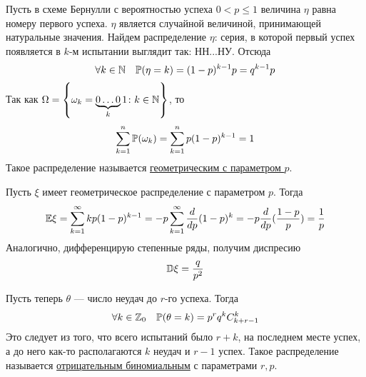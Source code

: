 \documentclass[../TV&MS.tex]{subfiles}
\begin{document}
Пусть в схеме Бернулли с вероятностью успеха $0 < p \le 1$ величина $\eta$ равна номеру первого успеха. $\eta$ является случайной величиной, принимающей натуральные значения. Найдем распределение $\eta$: серия, в которой первый успех появляется в $k$-м испытании выглядит так: НН...НУ. Отсюда
$$\forall k \in \mathbb{N} \quad \mathbb{P}(\eta = k) = (1-p)^{k-1}p = q^{k-1}p $$
Так как $\Omega = \left\{ \omega_k = \underbrace{0\ldots0}_k1 \colon k \in \mathbb{N} \right\}$, то 
$$\sum\limits_{k = 1}^{n}\mathbb{P}(\omega_k) = \sum\limits_{k = 1}^{n} p(1-p)^{k-1} = 1$$
Такое распределение называется \underline{геометрическим с параметром $p$}.

Пусть $\xi$ имеет геометрическое распределение с параметром $p$. Тогда
$$\mathbb{E}\xi = \sum\limits_{k = 1}^{\infty}kp(1-p)^{k-1} = -p\sum\limits_{k = 1}^{\infty}\frac{d}{dp}(1-p)^k = -p \frac{d}{dp}(\frac{1-p}{p}) = \frac1{p}$$
Аналогично, дифференцирую степенные ряды, получим диспресию
$$\mathbb{D}\xi = \frac{q}{p^2}$$

Пусть теперь $\theta$ --- число неудач до $r$-го успеха. Тогда
$$\forall k \in\mathbb{Z}_0 \quad \mathbb{P}(\theta = k) = p^rq^kC_{k+r-1}^{k}$$
Это следует из того, что всего испытаний было $r+k$, на последнем месте успех, а до него как-то располагаются $k$ неудач и $r-1$ успех.
Такое распределение называется \underline{отрицательным биномиальным} с параметрами $r, p$.

\newpage
\end{document}
